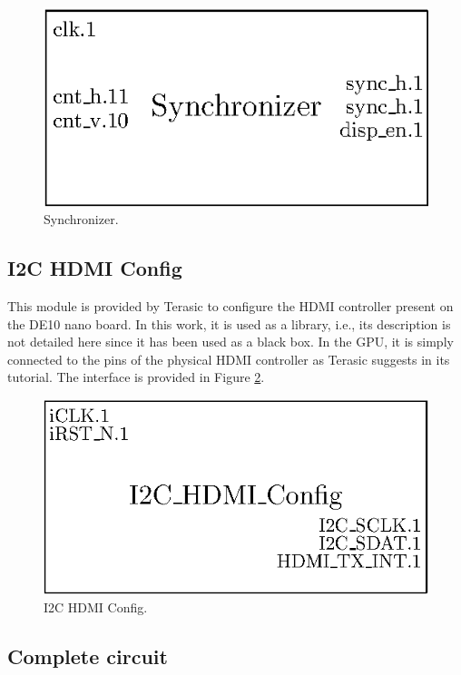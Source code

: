 \begin{figure}[H]
    \centering
    \includegraphics[scale=1.0]{Chapter4-GPU_CLKU/res/synchronizer}
    \caption{Synchronizer.}
    \label{fig:gpu/synchronizer}
\end{figure}

\subsection{I2C HDMI Config}

This module is provided by Terasic to configure the HDMI controller present on the DE10 nano board. 
In this work, it is used as a library, i.e., its description is not detailed here since it has been used as a black box. In the GPU, it is simply connected to the pins of the physical
HDMI controller as Terasic suggests in its tutorial. The interface is provided in 
Figure \ref{fig:gpu/i2c}.

\begin{figure}[H]
    \centering
    \includegraphics[scale=0.8]{Chapter4-GPU_CLKU/res/i2c}
    \caption{I2C HDMI Config.}
    \label{fig:gpu/i2c}
\end{figure}

\subsection{Complete circuit}

